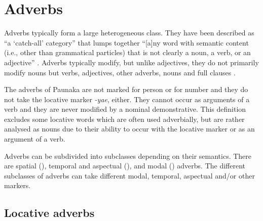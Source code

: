 
\section{Adverbs}\label{sec:Adverbs}

Adverbs typically form a large heterogeneous class. They have been described as “a ‘catch-all’ category” that lumps together “[a]ny word with semantic content (i.e., other than grammatical particles) that is not clearly a noun, a verb, or an adjective” \citep[69]{Payne1997}. Adverbs typically modify, but unlike adjectives, they do not primarily modify nouns but verbs, adjectives, other adverbs, nouns and full clauses \citep[715]{Evans2000}.

The adverbs of Paunaka are not marked for person or for number and they do not take the locative marker \textit{-yae}, either. They cannot occur as arguments of a verb and they are never modified by a nominal demonstrative. This definition excludes some locative words which are often used adverbially, but are rather analysed as nouns due to their ability to occur with the locative marker or as an argument of a verb. %

\hspace*{-1.3pt}Adverbs can be subdivided into subclasses depending on their semantics. There are spatial (), temporal and aspectual (), and modal () adverbs. The different subclasses of adverbs can take different modal, temporal, aspectual and/or other markers.



\subsection{Locative adverbs}\label{sec:LocativeAdverbs}


